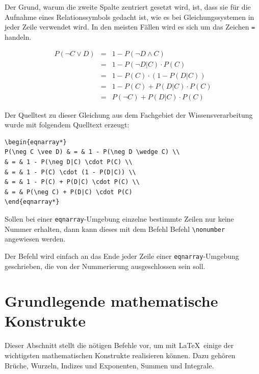 \documentclass[a4paper,10pt,twoside]{scrbook}
\begin{document}
Der Grund, warum die zweite Spalte zentriert gesetzt wird, ist, dass 
sie für die Aufnahme eines Relationssymbols gedacht ist, wie es bei 
Gleichungssystemen in jeder Zeile verwendet wird. In den meisten Fällen wird es sich um 
das Zeichen \verb!=! handeln. 

\begin{eqnarray*}
	P(\neg C \vee D) & = & 1 - P(\neg D \wedge C) \\
	& = & 1 - P(\neg D|C) \cdot P(C) \\
	& = & 1 - P(C) \cdot (1 - P(D|C)) \\
	& = & 1 - P(C) + P(D|C) \cdot P(C) \\		 
	& = & P(\neg C) + P(D|C) \cdot P(C)
\end{eqnarray*}

Der Quelltest zu dieser Gleichung aus dem Fachgebiet der
Wissensverarbeitung wurde mit folgendem Quelltext erzeugt:

\begin{lstlisting}[label=eqnarraybeispiel, style=customlatex]
\begin{eqnarray*}
P(\neg C \vee D) & = & 1 - P(\neg D \wedge C) \\
& = & 1 - P(\neg D|C) \cdot P(C) \\
& = & 1 - P(C) \cdot (1 - P(D|C)) \\
& = & 1 - P(C) + P(D|C) \cdot P(C) \\		 
& = & P(\neg C) + P(D|C) \cdot P(C)
\end{eqnarray*}
\end{lstlisting}


Sollen bei einer \verb!eqnarray!-Umgebung einzelne bestimmte Zeilen 
nur keine Nummer erhalten, dann
kann dieses mit dem Befehl Befehl \verb!\nonumber!
angewiesen werden. 


Der Befehl wird einfach an das Ende jeder Zeile einer 
\verb!eqnarray!-Umgebung geschrieben, die
von der Nummerierung ausgeschlossen sein soll.


\section{Grundlegende mathematische Konstrukte}

Dieser Abschnitt stellt die nötigen Befehle vor, um mit \LaTeX\ einige der wichtigsten 
mathematischen Konstrukte realisieren können. 
Dazu gehören Brüche, Wurzeln,
Indizes und Exponenten, Summen und Integrale.
\end{document}
